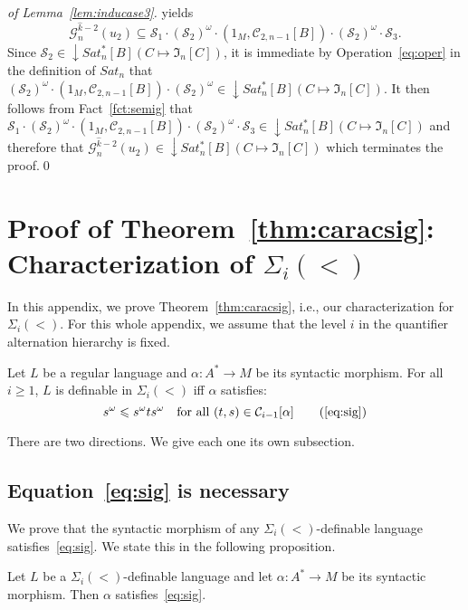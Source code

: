 \documentclass[envcountsame]{llncs}
\newcounter{sauvegarde}
\newcommand\adjustc[1]{\protect{\setcounter{sauvegarde}{\thetheorem}
  \setcounterref{theorem}{#1}
  \addtocounter{theorem}{-1}
}}
\newcommand\restorec{
\setcounter{theorem}{\thesauvegarde}
}
\newcommand\Cs{\ensuremath{\mathcal{C}}\xspace}
\newcommand\Cslev[1]{\ensuremath{\Cs_{#1}}\xspace}
\newcommand\Cstwolen[1]{\ensuremath{\Cs_{2,#1}}\xspace}
\newcommand\Gs{\ensuremath{\mathcal{G}}\xspace}
\newcommand\Ss{\ensuremath{\mathcal{S}}\xspace}
\newcommand{\siw}[1]{\ensuremath{\Sigma_{#1}(<)}\xspace}
\newcommand\lmo{\ensuremath{\leqslant}\xspace}
\let\geq\geqslant
\newcommand\fI{\ensuremath{\mathfrak I}\xspace}
\DeclareMathOperator{\downclos}{\downarrow}
\begin{document}
\begin{proof}[of Lemma~\ref{lem:inducase3}]
  yields
  \[
  \Gs_n^{\widehat{k}-2}(u_2) \subseteq \Ss_1 \cdot
  (\Ss_2)^\omega \cdot (1_M,\Cstwolen{n-1}[B]) \cdot
  (\Ss_2)^\omega \cdot \Ss_3.
  \]
  Since $\Ss_2 \in \downclos Sat^{*}_n[B](C \mapsto \fI_n[C])$, it is
  immediate by Operation~\eqref{eq:oper} in the definition of $Sat_n$
  that $(\Ss_2)^\omega \cdot (1_M,\Cstwolen{n-1}[B]) \cdot (\Ss_2)^\omega
  \in \downclos Sat^{*}_n[B](C \mapsto \fI_n[C])$. It then follows from
  Fact~\ref{fct:semig} that $\Ss_1 \cdot
  (\Ss_2)^\omega \cdot (1_M,\Cstwolen{n-1}[B]) \cdot
  (\Ss_2)^\omega \cdot \Ss_3 \in  \downclos Sat^{*}_n[B](C \mapsto
  \fI_n[C])$ and therefore that $\Gs_n^{\widehat{k}-2}(u_2) \in
  \downclos Sat^{*}_n[B](C \mapsto \fI_n[C])$ which terminates the proof.\qed
\end{proof}


\section{Proof of Theorem~\ref{thm:caracsig}: Characterization of \siw{i}}
\label{app:sig}
In this appendix, we prove Theorem~\ref{thm:caracsig}, i.e., our
characterization for \siw{i}. For this whole appendix, we assume that
the level $i$ in the quantifier alternation hierarchy is fixed.

\adjustc{thm:caracsig}
\begin{theorem}
  Let $L$ be a regular language and $\alpha: A^* \rightarrow M$ be its
  syntactic morphism. For all $i \geq 1$, $L$ is definable in \siw{i}
  iff $\alpha$ satisfies: 
  \begin{equation}
    s^{\omega} \lmo s^{\omega}ts^{\omega} \quad \text{for all $(t,s) \in \Cslev{i-1}[\alpha]$} \tag{\ref{eq:sig}}
  \end{equation}
\end{theorem}
\restorec
There are two directions. We give each one its own subsection.

\subsection{Equation~\eqref{eq:sig} is necessary}

We prove that the syntactic morphism of any \siw{i}-definable language
satisfies~\eqref{eq:sig}. We state this in the following proposition.

\begin{proposition} \label{prop:signec}
  Let $L$ be a \siw{i}-definable language and let $\alpha : A^* 
  \rightarrow M$ be its syntactic morphism. Then $\alpha$
  satisfies~\eqref{eq:sig}.
\end{proposition}
\end{document}
